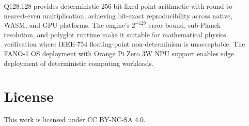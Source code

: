 \documentclass[11pt]{article}
\begin{document}
Q128.128 provides deterministic 256-bit fixed-point arithmetic with round-to-nearest-even multiplication, achieving bit-exact reproducibility across native, WASM, and GPU platforms. The engine's $2^{-129}$ error bound, sub-Planck resolution, and polyglot runtime make it suitable for mathematical physics verification where IEEE-754 floating-point non-determinism is unacceptable. The FANO-1 OS deployment with Orange Pi Zero 3W NPU support enables edge deployment of deterministic computing workloads.

\section*{License}

This work is licensed under CC BY-NC-SA 4.0.



\end{document}
